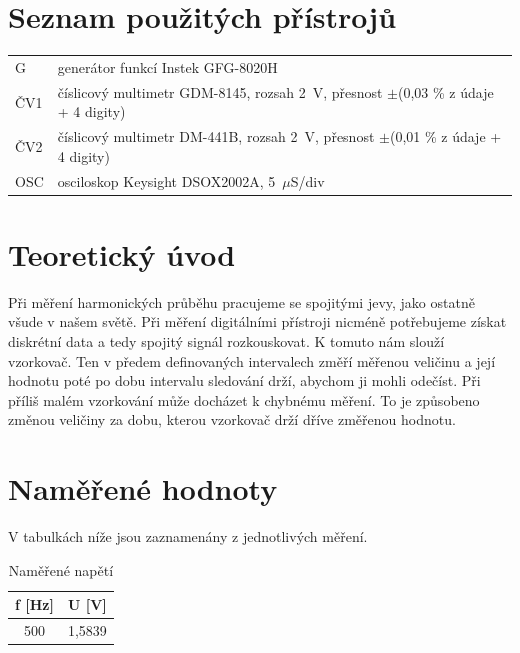 \documentclass[a4paper,12pt]{article}   %
\newcommand{\tmu}{$\mu$}
\newcommand{\tpm}{$\pm$}
\begin{document}
\section{Seznam použitých přístrojů}
\label{chap:seznam_pristroju}
\begin{table}
  \begin{tabular}{ll}
        G & generátor funkcí Instek GFG-8020H\\
        ČV1 & číslicový multimetr GDM-8145, rozsah 2~V, přesnost \tpm (0,03 \% z údaje + 4 digity)\\
        ČV2 & číslicový multimetr DM-441B, rozsah 2~V, přesnost \tpm (0,01 \% z údaje + 4 digity)\\
        OSC & osciloskop Keysight DSOX2002A, 5~\tmu S/div\\
  \end{tabular}
\end{table}

\section{Teoretický úvod}
\label{chap:teoreticky_uvod}
Při měření harmonických průběhu pracujeme se spojitými jevy, jako ostatně všude v našem světě. Při měření digitálními přístroji nicméně potřebujeme získat diskrétní data a tedy spojitý signál rozkouskovat. K tomuto nám slouží vzorkovač. Ten v předem definovaných intervalech změří měřenou veličinu a její hodnotu poté po dobu intervalu sledování drží, abychom ji mohli odečíst. Při příliš malém vzorkování může docházet k chybnému měření. To je způsobeno změnou veličiny za dobu, kterou vzorkovač drží dříve změřenou hodnotu.

\section{Naměřené hodnoty}
\label{chap:namerene_hodnoty}
V tabulkách níže jsou zaznamenány z jednotlivých měření.
\begin{table}[h!]
  \centering
  \begin{tabular}{|c|c|}
    \hline
    f [Hz]&U [V]\\\hline\hline
    500&1,5839\\\hline
  \end{tabular}
  \caption{Naměřené napětí}
  \label{tab:napeti}  
\end{table}
\end{document}
